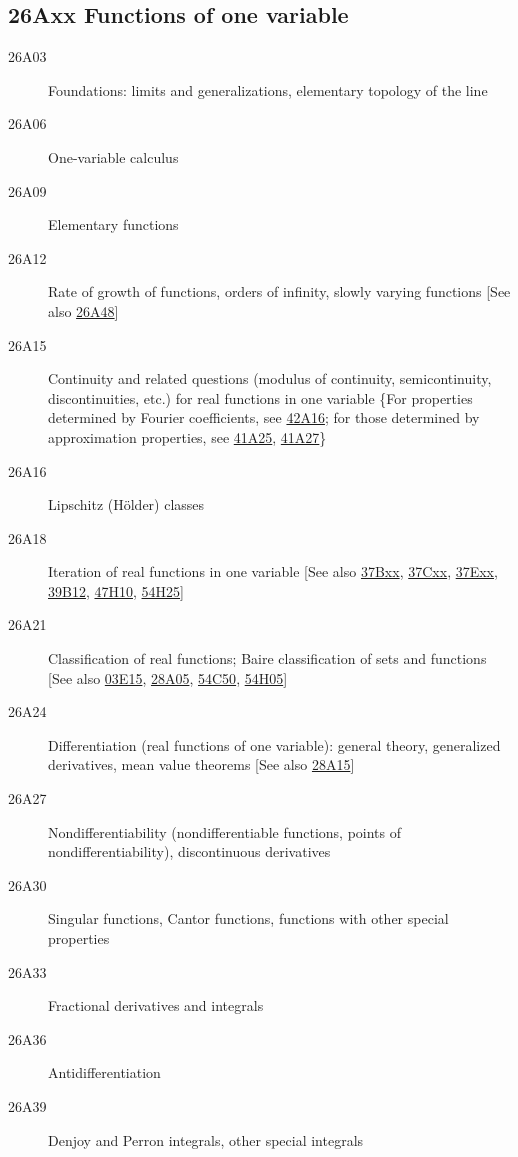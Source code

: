 \subsection*{26Axx  Functions of one variable }\label{26Axx}
\begin{description}  
\item [26A03]\label{26A03} Foundations: limits and generalizations, elementary topology of the line
\item [26A06]\label{26A06} One-variable calculus 
\item [26A09]\label{26A09} Elementary functions
\item [26A12]\label{26A12} Rate of growth of functions, orders of infinity, slowly varying functions [See also \hyperref[26A48]{26A48}]
\item [26A15]\label{26A15} Continuity and related questions (modulus of continuity, semicontinuity, discontinuities, etc.) for real functions in one variable \{For properties determined by Fourier coefficients, see \hyperref[42A16]{42A16}; for those determined by approximation properties, see \hyperref[41A25]{41A25}, \hyperref[41A27]{41A27}\}
\item [26A16]\label{26A16} Lipschitz (H\"{o}lder) classes
\item [26A18]\label{26A18} Iteration of real functions in one variable [See also \hyperref[37Bxx]{37Bxx}, \hyperref[37Cxx]{37Cxx}, \hyperref[37Exx]{37Exx}, \hyperref[39B12]{39B12}, \hyperref[47H10]{47H10}, \hyperref[54H25]{54H25}]
\item [26A21]\label{26A21} Classification of real functions; Baire classification of sets and functions [See also \hyperref[03E15]{03E15}, \hyperref[28A05]{28A05}, \hyperref[54C50]{54C50}, \hyperref[54H05]{54H05}]
\item [26A24]\label{26A24} Differentiation (real functions of one variable): general theory, generalized derivatives, mean value theorems [See also \hyperref[28A15]{28A15}]
\item [26A27]\label{26A27} Nondifferentiability (nondifferentiable functions, points of nondifferentiability), discontinuous derivatives
\item [26A30]\label{26A30} Singular functions, Cantor functions, functions with other special properties
\item [26A33]\label{26A33} Fractional derivatives and integrals
\item [26A36]\label{26A36} Antidifferentiation
\item [26A39]\label{26A39} Denjoy and Perron integrals, other special integrals

\end{description}
